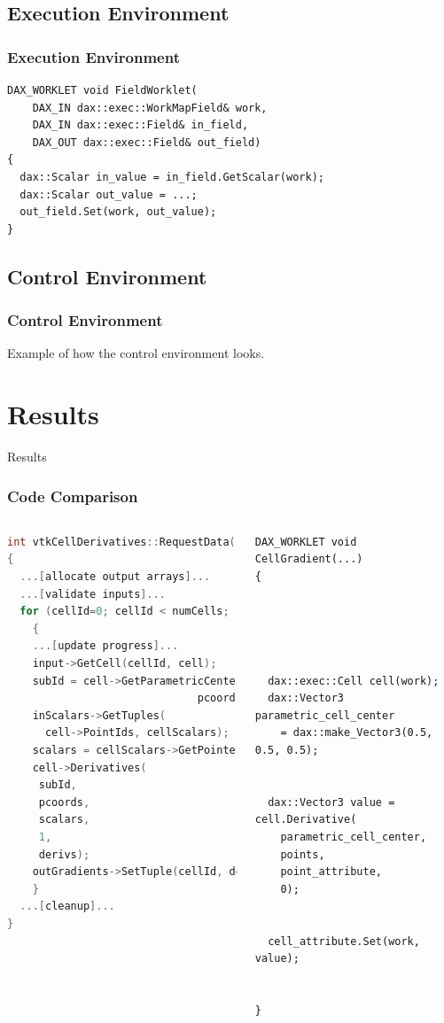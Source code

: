 \documentclass[brown]{beamer}
\newcommand\mysection[1]{
  \section{#1}
  \begin{frame}
    \begin{center}{\LARGE
      #1
      }
    \end{center}
  \end{frame}
}
\begin{document}
\subsection{Execution Environment}
\begin{frame}[fragile]
\frametitle{Execution Environment}
\begin{lstlisting}[language=Dax]
DAX_WORKLET void FieldWorklet(
    DAX_IN dax::exec::WorkMapField& work,
    DAX_IN dax::exec::Field& in_field,
    DAX_OUT dax::exec::Field& out_field)
{
  dax::Scalar in_value = in_field.GetScalar(work);
  dax::Scalar out_value = ...;
  out_field.Set(work, out_value);
}
\end{lstlisting}
\end{frame}

\subsection{Control Environment}
\frame
{
  \frametitle{Control Environment}
  Example of how the control environment looks.
}

\mysection{Results}

\begin{frame}[fragile]
\frametitle{Code Comparison}
\begin{columns}[l]
\begin{lstlisting}[language=C++,basicstyle=\tiny\ttfamily]
int vtkCellDerivatives::RequestData(...)
{
  ...[allocate output arrays]...
  ...[validate inputs]...
  for (cellId=0; cellId < numCells; cellId++)
    {
    ...[update progress]...
    input->GetCell(cellId, cell);
    subId = cell->GetParametricCenter(
                              pcoords);
    inScalars->GetTuples(
      cell->PointIds, cellScalars);
    scalars = cellScalars->GetPointer(0);
    cell->Derivatives(
     subId,
     pcoords,
     scalars,
     1,
     derivs);
    outGradients->SetTuple(cellId, derivs);
    }
  ...[cleanup]...
}
\end{lstlisting}

\begin{lstlisting}[language=Dax, basicstyle=\tiny\ttfamily]
DAX_WORKLET void CellGradient(...)
{





  dax::exec::Cell cell(work);
  dax::Vector3 parametric_cell_center
    = dax::make_Vector3(0.5, 0.5, 0.5);
 

  dax::Vector3 value = cell.Derivative(
    parametric_cell_center,
    points,
    point_attribute,
    0);


  cell_attribute.Set(work, value);


}
\end{lstlisting}
\end{columns}
\end{frame}
\end{document}
